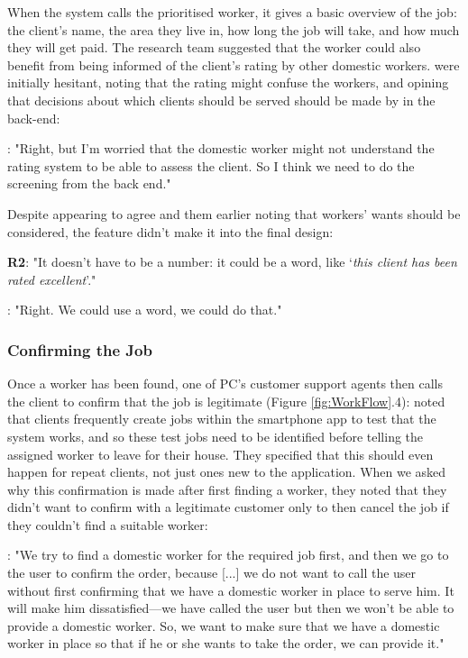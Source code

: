 When the system calls the prioritised worker, it gives a basic overview of the job: the client's name, the area they live in, how long the job will take, and how much they will get paid. The research team suggested that the worker could also benefit from being informed of the client's rating by other domestic workers. \PC{} were initially hesitant, noting that the rating might confuse the workers, and opining that decisions about which clients should be served should be made by \PC{} in the back-end: 

\begin{displayquote}
\textbf{\PCTwo{}}: "Right, but I’m worried that the domestic worker might not understand the rating system to be able to assess the client. So I think we need to do the screening from the back end."
\end{displayquote}

Despite appearing to agree and them earlier noting that workers' wants should be considered, the feature didn't make it into the final design:

\begin{displayquote}
\textbf{R2}: "It doesn't have to be a number: it could be a word, like ‘\textit{this client has been rated excellent}’."

\textbf{\PCTwo{}}: "Right. We could use a word, we could do that."
\end{displayquote}


\subsubsection{Confirming the Job}

Once a worker has been found, one of PC's customer support agents then calls the client to confirm that the job is legitimate (Figure \ref{fig:WorkFlow}.4): \PCTwo{} noted that clients frequently create jobs within the smartphone app to test that the system works, and so these test jobs need to be identified before telling the assigned worker to leave for their house. They specified that this should even happen for repeat clients, not just ones new to the application. When we asked why this confirmation is made after first finding a worker, they noted that they didn't want to confirm with a legitimate customer only to then cancel the job if they couldn't find a suitable worker: 

\begin{displayquote}
\textbf{\PCTwo{}}: "We try to find a domestic worker for the required job first, and then we go to the user to confirm the order, because [...] we do not want to call the user without first confirming that we have a domestic worker in place to serve him. It will make him dissatisfied---we have called the user but then we won’t be able to provide a domestic worker. So, we want to make sure that we have a domestic worker in place so that if he or she wants to take the order, we can provide it."
\end{displayquote}

